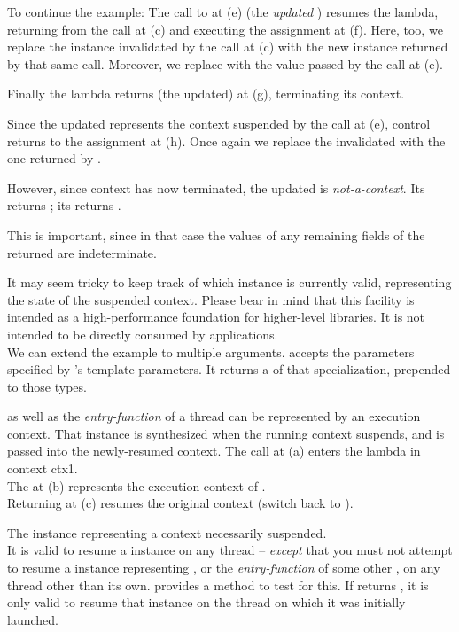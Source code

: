 To continue the example:
The call to  at (e) (the \emph{updated} ) resumes
the  lambda, returning from the  call at (c) and
executing the assignment at (f). Here, too, we replace the \ectx
instance  invalidated by the \op call at (c) with the new instance
returned by that same \op call. Moreover, we replace  with the value
passed by the call at (e).

Finally the lambda returns (the updated)  at (g), terminating its
context.

Since the updated  represents the context suspended by the call at
(e), control returns to the assignment at (h). Once again we replace the
invalidated  with the one returned by \op.

However, since context  has now terminated, the updated 
is \emph{not-a-context}. Its \opbool returns ;
its  returns .

This is important, since in that case the values of any remaining fields of
the returned  are indeterminate.

It may seem tricky to keep track of which \ectx instance is currently
valid, representing the state of the suspended context. Please bear in
mind that this facility is intended as a high-performance foundation for
higher-level libraries. It is not intended to be directly consumed by
applications.\\
\newpage
We can extend the example to multiple arguments.
\op accepts the parameters specified by \ectx's template parameters. It
returns a  of that \ectx specialization, prepended to those
types.


\label{subsec:main}
\main as well as the \emph{entry-function} of a thread can be represented by an
execution context. That \ectx instance is synthesized when the running context
suspends, and is passed into the newly-resumed context.
The  call at (a) enters the lambda in context ctx1.\\
The \ectx {} at (b) represents the execution context of \main.\\
Returning  at (c) resumes the original context (switch back to
\main).


The \ectx instance representing a context necessarily suspended.\\
It is
valid to resume a \ectx instance on any thread -- \emph{except} that you must
not attempt to resume a \ectx instance representing \main, or
the \emph{entry-function} of some other , on any thread other
than its own.
\ectx provides a method to test for this.
If  returns , it is
only valid to resume that
\ectx instance on the thread on which it was initially launched.


